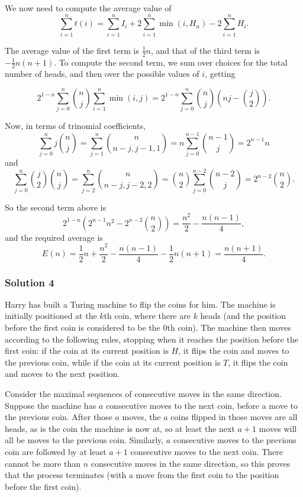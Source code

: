 We now need to compute the average value of
\[
\sum_{i=1}^{n} t(i) = \sum_{i=1}^{n} I_i + 2 \sum_{i=1}^{n} \min(i, H_n) - 2 \sum_{i=1}^{n} H_i.
\]

The average value of the first term is $\frac{1}{2}n$, and that of the third term is $-\frac{1}{2}n(n+1)$. To compute the second term, we sum over choices for the total number of heads, and then over the possible values of $i$, getting

\[
2^{1-n} \sum_{j=0}^{n} \binom{n}{j} \sum_{i=1}^{n} \min(i, j) = 2^{1-n} \sum_{j=0}^{n} \binom{n}{j} \left( nj - \binom{j}{2} \right).
\]

Now, in terms of trinomial coefficients,
\[
\sum_{j=0}^{n} j \binom{n}{j} = \sum_{j=1}^{n} \binom{n}{n - j, j - 1, 1} = n \sum_{j=0}^{n-1} \binom{n - 1}{j} = 2^{n - 1} n
\]
and
\[
\sum_{j=0}^{n} \binom{j}{2} \binom{n}{j} = \sum_{j=2}^{n} \binom{n}{n - j, j - 2, 2} = \binom{n}{2} \sum_{j=0}^{n-2} \binom{n - 2}{j} = 2^{n - 2} \binom{n}{2}.
\]

So the second term above is
\[
2^{1-n} \left( 2^{n - 1} n^2 - 2^{n - 2} \binom{n}{2} \right) = \frac{n^2}{2} - \frac{n(n - 1)}{4},
\]
and the required average is
\[
E(n) = \frac{1}{2}n + \frac{n^2}{2} - \frac{n(n - 1)}{4} - \frac{1}{2}n(n + 1) = \frac{n(n + 1)}{4}.
\]

\subsubsection*{Solution 4}
Harry has built a Turing machine to flip the coins for him. The machine is initially positioned at the $k$th coin, where there are $k$ heads (and the position before the first coin is considered to be the $0$th coin). The machine then moves according to the following rules, stopping when it reaches the position before the first coin: if the coin at its current position is $H$, it flips the coin and moves to the previous coin, while if the coin at its current position is $T$, it flips the coin and moves to the next position.

Consider the maximal sequences of consecutive moves in the same direction. Suppose the machine has $a$ consecutive moves to the next coin, before a move to the previous coin. After those $a$ moves, the $a$ coins flipped in those moves are all heads, as is the coin the machine is now at, so at least the next $a + 1$ moves will all be moves to the previous coin. Similarly, $a$ consecutive moves to the previous coin are followed by at least $a + 1$ consecutive moves to the next coin. There cannot be more than $n$ consecutive moves in the same direction, so this proves that the process terminates (with a move from the first coin to the position before the first coin).

